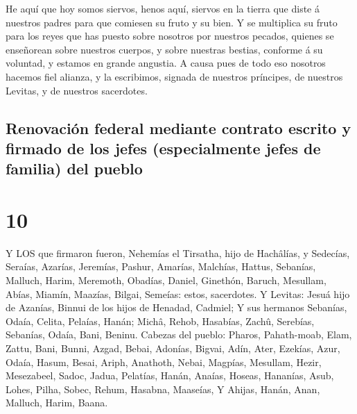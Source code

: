  He aquí que hoy somos siervos, henos aquí, siervos en la
tierra que diste á nuestros padres para que comiesen su fruto y su bien.
 Y se multiplica su fruto para los reyes que has puesto
sobre nosotros por nuestros pecados, quienes se enseñorean sobre
nuestros cuerpos, y sobre nuestras bestias, conforme á su voluntad, y
estamos en grande angustia.  A causa pues de todo eso
nosotros hacemos fiel alianza, y la escribimos, signada de nuestros
príncipes, de nuestros Levitas, y de nuestros sacerdotes.

\hypertarget{renovaciuxf3n-federal-mediante-contrato-escrito-y-firmado-de-los-jefes-especialmente-jefes-de-familia-del-pueblo}{%
\subsection{Renovación federal mediante contrato escrito y firmado de
los jefes (especialmente jefes de familia) del
pueblo}\label{renovaciuxf3n-federal-mediante-contrato-escrito-y-firmado-de-los-jefes-especialmente-jefes-de-familia-del-pueblo}}

\hypertarget{section-9}{%
\section{10}\label{section-9}}

 Y LOS que firmaron fueron, Nehemías el Tirsatha, hijo de
Hachâlías, y Sedecías,  Seraías, Azarías, Jeremías,
 Pashur, Amarías, Malchías,  Hattus, Sebanías,
Malluch,  Harim, Meremoth, Obadías,  Daniel,
Ginethón, Baruch,  Mesullam, Abías, Miamín, 
Maazías, Bilgai, Semeías: estos, sacerdotes.  Y Levitas:
Jesuá hijo de Azanías, Binnui de los hijos de Henadad, Cadmiel;
 Y sus hermanos Sebanías, Odaía, Celita, Pelaías, Hanán;
 Michâ, Rehob, Hasabías,  Zachû, Serebías,
Sebanías,  Odaía, Bani, Beninu.  Cabezas del
pueblo: Pharos, Pahath-moab, Elam, Zattu, Bani,  Bunni,
Azgad, Bebai,  Adonías, Bigvai, Adín,  Ater,
Ezekías, Azur,  Odaía, Hasum, Besai,  Ariph,
Anathoth, Nebai,  Magpías, Mesullam, Hezir, 
Mesezabeel, Sadoc, Jadua,  Pelatías, Hanán, Anaías,
 Hoseas, Hananías, Asub,  Lohes, Pilha, Sobec,
 Rehum, Hasabna, Maaseías,  Y Ahijas, Hanán,
Anan,  Malluch, Harim, Baana.

